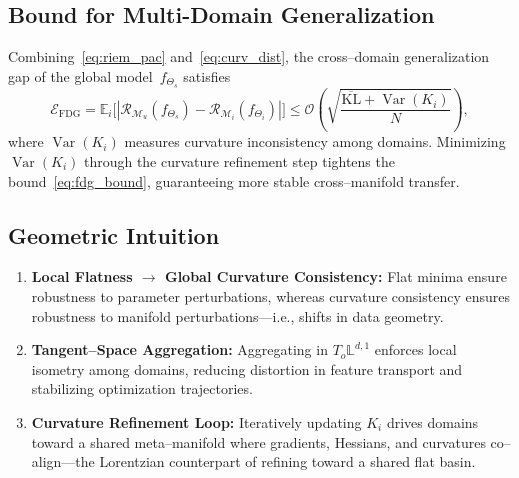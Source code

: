 \documentclass[10pt]{article} %
\begin{document}
\subsection{Bound for Multi-Domain Generalization}
Combining~\eqref{eq:riem_pac} and~\eqref{eq:curv_dist}, the cross--domain
generalization gap of the global model~$f_{\Theta_s}$ satisfies
\begin{equation}
\mathcal{E}_{\text{FDG}}
 =
\mathbb{E}_{i}\!
\big[
|\mathcal{R}_{\mathcal{M}_u}(f_{\Theta_s})
 -\mathcal{R}_{\mathcal{M}_i}(f_{\Theta_i})|
\big]
\le
\mathcal{O}\!\left(
\sqrt{
\frac{
\overline{\mathrm{KL}}
+\operatorname{Var}(K_i)}
{N}}
\right),
\label{eq:fdg_bound}
\end{equation}
where $\operatorname{Var}(K_i)$ measures curvature inconsistency among
domains. Minimizing $\operatorname{Var}(K_i)$ through the curvature
refinement step tightens the bound~\eqref{eq:fdg_bound}, guaranteeing
more stable cross--manifold transfer.

\subsection{Geometric Intuition}
\begin{enumerate}[label=(\alph*)]
  \item \textbf{Local Flatness $\to$ Global Curvature Consistency:}
        Flat minima ensure robustness to parameter perturbations,
        whereas curvature consistency ensures robustness to manifold
        perturbations---i.e., shifts in data geometry.
  \item \textbf{Tangent--Space Aggregation:}
        Aggregating in $T_o\mathbb{L}^{d,1}$ enforces local isometry
        among domains, reducing distortion in feature transport and
        stabilizing optimization trajectories.
  \item \textbf{Curvature Refinement Loop:}
        Iteratively updating $K_i$ drives domains toward a shared
        meta--manifold where gradients, Hessians, and curvatures
        co--align---the Lorentzian counterpart of refining toward a
        shared flat basin.
\end{enumerate}
\end{document}
